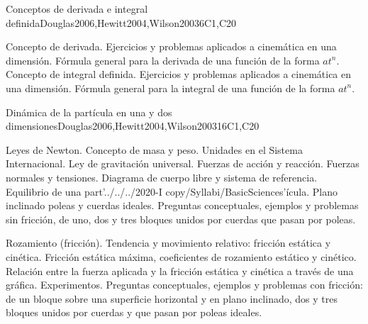 \begin{syllabus}
\begin{unit}{Conceptos de derivada e integral definida}{}{Douglas2006,Hewitt2004,Wilson2003}{6}{C1,C20}
\begin{topics}
      \item Concepto de derivada. Ejercicios y problemas aplicados a cinemática en una dimensión. Fórmula general para la derivada de una función de la forma $at^{n}$. Concepto de integral definida. Ejercicios y problemas aplicados a cinemática en una dimensión. Fórmula general para la integral de una función de la forma $at^{n}$.
\end{topics}

\end{unit}

\begin{unit}{Dinámica de la partícula en una y dos dimensiones}{}{Douglas2006,Hewitt2004,Wilson2003}{16}{C1,C20}
\begin{topics}
      \item Leyes de Newton. Concepto de masa y peso. Unidades en el Sistema Internacional. Ley de gravitación universal. Fuerzas de acción y reacción. Fuerzas normales y tensiones. Diagrama de cuerpo libre y sistema de referencia. Equilibrio de una part'../../../2020-I copy/Syllabi/BasicSciences'ícula. Plano inclinado poleas y cuerdas ideales. Preguntas conceptuales, ejemplos y problemas sin fricción, de uno, dos y tres bloques unidos por cuerdas que pasan por poleas.
      \item Rozamiento (fricción). Tendencia y movimiento relativo: fricción estática y cinética. Fricción estática máxima, coeficientes de rozamiento estático y cinético. Relación entre la fuerza aplicada y la fricción estática y cinética a través de una gráfica. Experimentos. Preguntas conceptuales, ejemplos y problemas con fricción: de un bloque sobre una superficie horizontal y en plano inclinado, dos y tres bloques unidos por cuerdas y que pasan por poleas ideales.
   \end{topics}
\end{unit}



\begin{coursebibliography}
\end{coursebibliography}

\end{syllabus}
